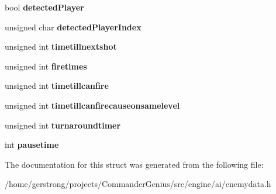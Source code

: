 \begin{DoxyCompactItemize}
\item 
\hypertarget{structst_tank_data_a7a2810a136c0aec5a51ea51e3a24781c}{
bool {\bfseries detectedPlayer}}
\label{structst_tank_data_a7a2810a136c0aec5a51ea51e3a24781c}

\item 
\hypertarget{structst_tank_data_af217646e46f746037d7a8bc6657383a5}{
unsigned char {\bfseries detectedPlayerIndex}}
\label{structst_tank_data_af217646e46f746037d7a8bc6657383a5}

\item 
\hypertarget{structst_tank_data_aad5326665debc9242d83a00774bfedd5}{
unsigned int {\bfseries timetillnextshot}}
\label{structst_tank_data_aad5326665debc9242d83a00774bfedd5}

\item 
\hypertarget{structst_tank_data_a1fb9a541c18a1b94c5d0a8f51bb8841d}{
unsigned int {\bfseries firetimes}}
\label{structst_tank_data_a1fb9a541c18a1b94c5d0a8f51bb8841d}

\item 
\hypertarget{structst_tank_data_a2785bbb9895994c8d8e81443362e9804}{
unsigned int {\bfseries timetillcanfire}}
\label{structst_tank_data_a2785bbb9895994c8d8e81443362e9804}

\item 
\hypertarget{structst_tank_data_a9bec4666ab49f27fe687848dff747958}{
unsigned int {\bfseries timetillcanfirecauseonsamelevel}}
\label{structst_tank_data_a9bec4666ab49f27fe687848dff747958}

\item 
\hypertarget{structst_tank_data_a4c75b5161af8f8405589fbd8c87f6511}{
unsigned int {\bfseries turnaroundtimer}}
\label{structst_tank_data_a4c75b5161af8f8405589fbd8c87f6511}

\item 
\hypertarget{structst_tank_data_ad8e8a1db5d1a2c7b4c65454325f32d8a}{
int {\bfseries pausetime}}
\label{structst_tank_data_ad8e8a1db5d1a2c7b4c65454325f32d8a}

\end{DoxyCompactItemize}


The documentation for this struct was generated from the following file:\begin{DoxyCompactItemize}
\item 
/home/gerstrong/projects/CommanderGenius/src/engine/ai/enemydata.h\end{DoxyCompactItemize}

